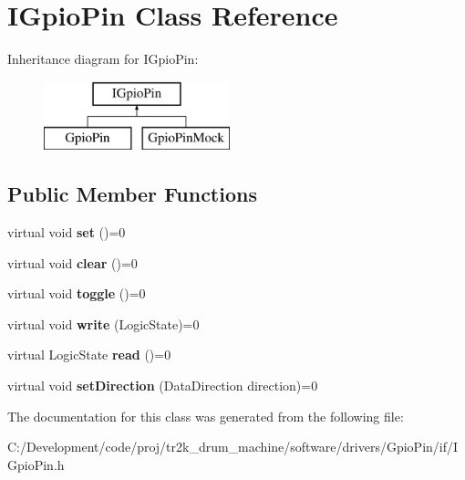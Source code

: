 \hypertarget{class_i_gpio_pin}{}\section{I\+Gpio\+Pin Class Reference}
\label{class_i_gpio_pin}
Inheritance diagram for I\+Gpio\+Pin\+:\begin{figure}[H]
\begin{center}
\leavevmode
\includegraphics[height=2.000000cm]{class_i_gpio_pin}
\end{center}
\end{figure}
\subsection*{Public Member Functions}
\begin{DoxyCompactItemize}
\item 
\mbox{\label{class_i_gpio_pin_aba7fc6b02a422e589f59265531b55d9a}} 
virtual void {\bfseries set} ()=0
\item 
\mbox{\label{class_i_gpio_pin_af51fe6fdf248e4d1a114b72a8dc4e19d}} 
virtual void {\bfseries clear} ()=0
\item 
\mbox{\label{class_i_gpio_pin_a1d068ad689c3d5044c91b6bb3ad63bce}} 
virtual void {\bfseries toggle} ()=0
\item 
\mbox{\label{class_i_gpio_pin_a47200f748224d9a66dc1e7205a43ea20}} 
virtual void {\bfseries write} (Logic\+State)=0
\item 
\mbox{\label{class_i_gpio_pin_a17d8a4224c3317f9c211ed12dfc54126}} 
virtual Logic\+State {\bfseries read} ()=0
\item 
\mbox{\label{class_i_gpio_pin_a4054e58e8681fb028601c72ecd8cd652}} 
virtual void {\bfseries set\+Direction} (Data\+Direction direction)=0
\end{DoxyCompactItemize}


The documentation for this class was generated from the following file\+:\begin{DoxyCompactItemize}
\item 
C\+:/\+Development/code/proj/tr2k\+\_\+drum\+\_\+machine/software/drivers/\+Gpio\+Pin/if/I\+Gpio\+Pin.\+h\end{DoxyCompactItemize}
